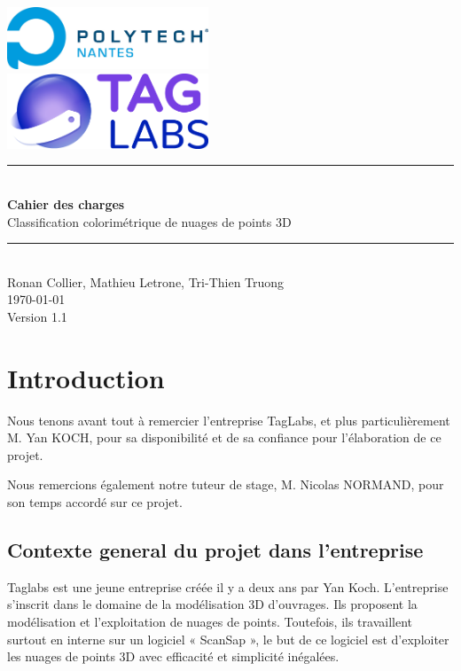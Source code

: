 \documentclass[12pt,titlepage,french]{article}
\begin{document}

\begin{titlepage}
\newcommand{\HRule}{\rule{\linewidth}{0.5mm}}
\center

  \includegraphics[width=0.45\textwidth]{./image2.png}\\[1cm]
   
  \includegraphics[width=0.45\textwidth]{./image1.png}


\HRule \\[0.4cm]
{ \huge \bfseries Cahier des charges \\[0.15cm] }
Classification colorimétrique de nuages de points 3D
\HRule \\[1.5cm]
Ronan Collier,
Mathieu Letrone,
Tri-Thien Truong
\\[1cm]
\today \\ [1cm]
Version 1.1
\end{titlepage}

\section{Introduction}

Nous tenons avant tout à remercier l'entreprise TagLabs, et plus particulièrement M. Yan KOCH, pour sa disponibilité et de sa confiance pour l'élaboration de ce projet.

Nous remercions également notre tuteur de stage, M. Nicolas NORMAND, pour son temps accordé sur ce projet.

\subsection*{Contexte general du projet dans l'entreprise}

Taglabs est une jeune entreprise créée il y a deux ans par Yan Koch. L’entreprise s’inscrit dans le domaine de la modélisation 3D d’ouvrages. Ils proposent la modélisation et l’exploitation de nuages de points. Toutefois, ils travaillent surtout en interne sur un logiciel « ScanSap », le but de ce logiciel est d’exploiter les nuages de points 3D avec efficacité et simplicité inégalées.
\end{document}
